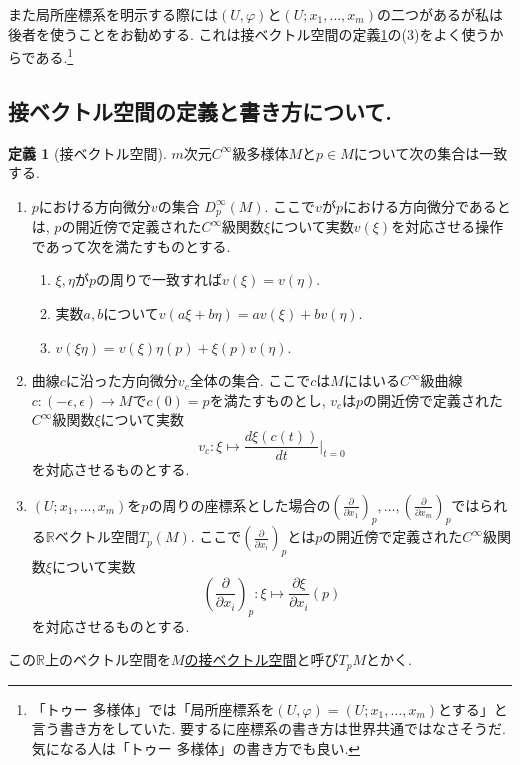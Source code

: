 \documentclass[dvipdfmx,a4paper,11pt]{article}
\newcommand{\R}{\mathbb{R}}
\theoremstyle{definition}
\newtheorem{dfn}[thm]{定義}
\newcommand{\pdrv}[2]{\frac{\partial #1}{\partial #2}}
\newcommand{\drv}[2]{\frac{d #1}{d#2}}
\begin{document}
また局所座標系を明示する際には$(U, \varphi)$と$(U; x_1, \ldots, x_m)$の二つがあるが私は後者を使うことをお勧めする. これは接ベクトル空間の定義\ref{tangent_vector_space}の(3)をよく使うからである.\footnote{「トゥー 多様体」では「局所座標系を$(U, \varphi)=(U; x_1, \ldots, x_m)$とする」と言う書き方をしていた. 要するに座標系の書き方は世界共通ではなさそうだ. 気になる人は「トゥー 多様体」の書き方でも良い.} 
 
\subsection{接ベクトル空間の定義と書き方について.}
\begin{tcolorbox}[
    colback = white,
    colframe = green!35!black,
    fonttitle = \bfseries,
    breakable = true]
    \begin{dfn}[接ベクトル空間]
    \label{tangent_vector_space}
    $m$次元$C^{\infty}$級多様体$M$と$p \in M$について次の集合は一致する.
     \begin{enumerate}
          \setlength{\parskip}{0cm}
  \setlength{\itemsep}{2pt} 
     \item $p$における方向微分$v$の集合 $D_{p}^{\infty}(M)$. ここで$v$が$p$における方向微分であるとは, $p$の開近傍で定義された$C^{\infty}$級関数$\xi$について実数$v(\xi)$を対応させる操作であって次を満たすものとする.
    \begin{enumerate}
         \setlength{\parskip}{0cm}
  \setlength{\itemsep}{2pt} 
    \item $\xi,\eta$が$p$の周りで一致すれば$v(\xi) =v(\eta)$.
    \item 実数$a,b$について$v(a\xi + b\eta)=av(\xi) + bv(\eta)$.
    \item $v(\xi\eta) = v(\xi)\eta(p) + \xi(p)v(\eta) $.
    \end{enumerate}
     \item 曲線$c$に沿った方向微分$v_{c}$全体の集合. ここで$c$は$M$にはいる$C^{\infty}$級曲線$c : (-\epsilon, \epsilon) \rightarrow M$で$c(0)=p$を満たすものとし, $v_{c}$は$p$の開近傍で定義された$C^{\infty}$級関数$\xi$について実数
     $$
     v_{c}:\xi \mapsto \drv{\xi(c(t))}{t}\Bigr|_{t=0}
     $$
     を対応させるものとする.
     \item $(U; x_1, \ldots, x_m)$を$p$の周りの座標系とした場合の$(\pdrv{}{x_1})_{p}, \ldots, (\pdrv{}{x_m})_{p}$ではられる$\R$ベクトル空間$T_{p}(M)$. ここで$(\pdrv{}{x_i})_{p}$とは$p$の開近傍で定義された$C^{\infty}$級関数$\xi$について実数
     $$
   \left(\pdrv{}{x_i}\right)_{p} :   \xi \mapsto \pdrv{\xi}{x_i}(p)
     $$
     を対応させるものとする.
     \end{enumerate}
     
     
この$\R$上のベクトル空間を\underline{$M$の接ベクトル空間}と呼び$T_{p}M$とかく. 
    \end{dfn}
    \end{tcolorbox}    
\end{document}
